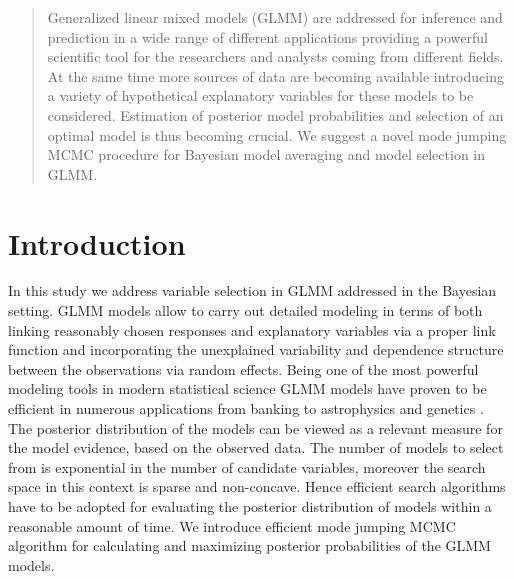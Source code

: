 \documentclass[a0,portrait]{a0poster}
\begin{document}
\begin{multicols}{2} %


\color{Navy} %

\begin{abstract}

Generalized linear mixed models (GLMM) are addressed for inference and prediction in a wide range of different applications providing a powerful scientific tool for the researchers and analysts coming from different fields. At the same time more sources of data are becoming available introducing a variety of hypothetical explanatory variables for these models to be considered. Estimation of posterior model probabilities and selection of an optimal model is thus becoming crucial. We suggest a novel mode jumping MCMC procedure for Bayesian model averaging and model selection in GLMM.

\end{abstract}


\color{SaddleBrown} %

\section*{Introduction}

In this study we address variable selection in GLMM addressed in the Bayesian setting. GLMM models allow to carry out detailed modeling in terms of both linking reasonably chosen responses and explanatory variables via a proper link function and incorporating the unexplained variability and dependence structure between the observations via random effects. Being one of the most powerful modeling tools in modern statistical science GLMM models have proven to be efficient in numerous applications from banking to astrophysics and genetics \cite{Hubin2016}. The posterior distribution of the models  can be viewed as a  relevant measure for the model evidence, based on the observed data. The number of models to select from is exponential in the number of candidate variables, moreover the search space in this context is sparse and non-concave. Hence efficient search algorithms have to be adopted for evaluating the posterior distribution of models within a reasonable amount of time. We introduce efficient mode jumping MCMC algorithm for calculating and maximizing posterior probabilities of the GLMM models. 


\end{multicols}
\end{document}
